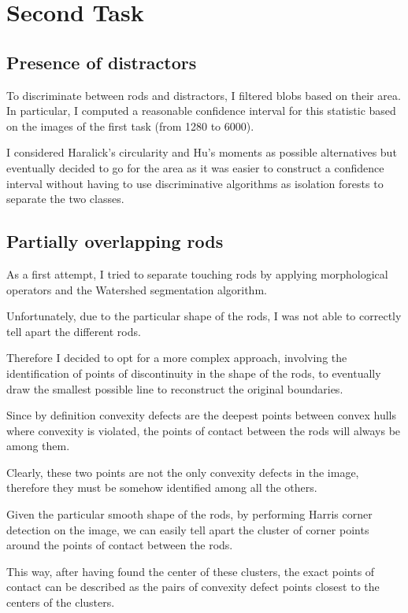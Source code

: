 \chapter{Second Task}
    \section{Presence of distractors}
        To discriminate between rods and distractors, I filtered blobs based on their area.
        In particular, I computed a reasonable confidence interval for this statistic based on the images of the first task (from 1280 to 6000).

        I considered Haralick's circularity and Hu's moments as possible alternatives but eventually decided to go for the area as it was easier to construct a confidence interval 
        without having to use discriminative algorithms as isolation forests to separate the two classes.

    \section{Partially overlapping rods}
        As a first attempt, I tried to separate touching rods by applying morphological operators and the Watershed segmentation algorithm.

        Unfortunately, due to the particular shape of the rods, I was not able to correctly tell apart the different rods.
        
        Therefore I decided to opt for a more complex approach, involving the identification of points of discontinuity in the shape of the rods, 
        to eventually draw the smallest possible line to reconstruct the original boundaries.
        
        Since by definition convexity defects are the deepest points between convex hulls where convexity is violated, 
        the points of contact between the rods will always be among them.
        
        Clearly, these two points are not the only convexity defects in the image, therefore they must be somehow identified 
        among all the others.
                
        Given the particular smooth shape of the rods, by performing Harris corner detection on the image, we can easily tell apart 
        the cluster of corner points around the points of contact between the rods.
        
        This way, after having found the center of these clusters, the exact points of contact can be described as the pairs of convexity 
        defect points closest to the centers of the clusters.

